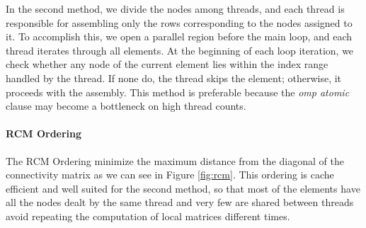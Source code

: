 \documentclass[hidelinks]{article}
\begin{document}
In the second method, we divide the nodes among threads, and each thread is responsible for assembling only the rows corresponding to the nodes assigned to it. To accomplish this, we open a parallel region before the main loop, and each thread iterates through all elements. At the beginning of each loop iteration, we check whether any node of the current element lies within the index range handled by the thread. If none do, the thread skips the element; otherwise, it proceeds with the assembly. This method is preferable because the \emph{omp atomic} clause may become a bottleneck on high thread counts.

\paragraph{RCM Ordering}
The RCM Ordering minimize the maximum distance from the diagonal of the connectivity matrix as we can see in Figure \ref{fig:rcm}. This ordering is cache efficient and well suited for the second method, so that most of the elements have all the nodes dealt by the same thread and very few are shared between threads avoid repeating the computation of local matrices different times.
\end{document}
